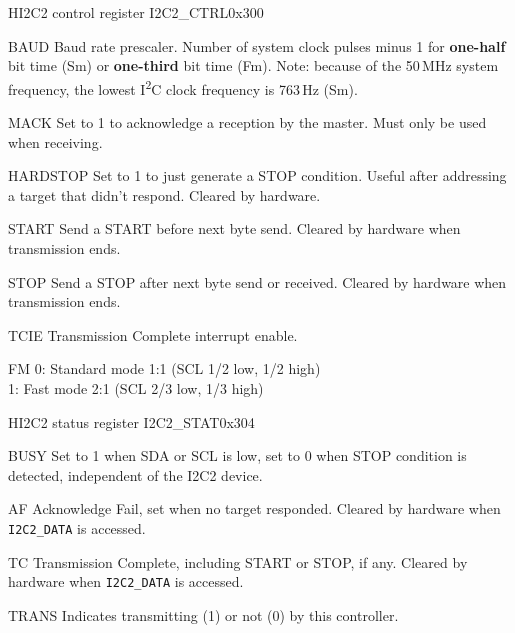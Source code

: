 \documentclass[12pt]{article}
\begin{document}
\begin{register}{H}{I2C2 control register I2C2\_CTRL}{0x300}
\label{i2c2ctrl}
%
%
%
%
%
%
%
%
%
\regnewline%
\end{register}
\begin{regdesc}[0.9\textwidth]\begin{reglist}[000000000]
\item [BAUD] Baud rate prescaler. Number of system clock pulses minus 1 for \textbf{one-half} bit time (Sm) or \textbf{one-third} bit time (Fm).
Note: because of the 50\,MHz system frequency, the lowest I\textsuperscript{2}C clock frequency is 763\,Hz (Sm).
\item [MACK] Set to 1 to acknowledge a reception by the master. Must only be used when receiving.
\item [HARDSTOP] Set to 1 to just generate a STOP condition. Useful after addressing a target that didn't respond. Cleared by hardware.
\item [START] Send a START before next byte send. Cleared by hardware when transmission ends.
\item [STOP] Send a STOP after next byte send or received. Cleared by hardware when transmission ends.
\item [TCIE] Transmission Complete interrupt enable.
\item [FM] 0: Standard mode 1:1 (SCL 1/2 low, 1/2 high)\\1: Fast mode 2:1 (SCL 2/3 low, 1/3 high)
\end{reglist}\end{regdesc}

\begin{register}{H}{I2C2 status register I2C2\_STAT}{0x304}
\label{i2c2stat}
%
%
%
%
%
%
\regnewline%
\end{register}
\begin{regdesc}[0.8\textwidth]\begin{reglist}[0000000]
\item [BUSY] Set to 1 when SDA or SCL is low, set to 0 when STOP condition is detected, independent of the I2C2 device.
\item [AF] Acknowledge Fail, set when no target responded. Cleared by hardware when \lstinline|I2C2_DATA| is accessed.
\item [TC] Transmission Complete, including START or STOP, if any. Cleared by hardware when \lstinline|I2C2_DATA| is accessed.
\item [TRANS] Indicates transmitting (1) or not (0) by this controller.
\end{reglist}\end{regdesc}
\end{document}
